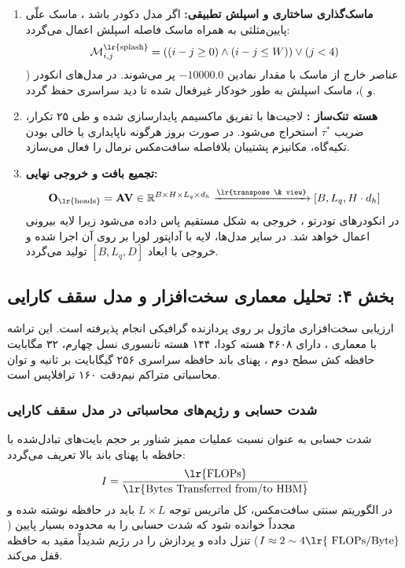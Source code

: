\begin{enumerate}
    \item \textbf{ماسک‌گذاری ساختاری و اسپلش تطبیقی:}
    اگر مدل دکودر باشد ، ماسک علّی پایین‌مثلثی به همراه ماسک فاصله اسپلش اعمال می‌گردد:
    \begin{equation}
    \mathcal{M}_{i, j}^{\text{\lr{splash}}} = \left( (i - j \ge 0) \land (i - j \le W) \right) \lor (j < 4)
    \end{equation}
    عناصر خارج از ماسک با مقدار نمادین $-10000.0$ پر می‌شوند. در مدل‌های انکودر ( و )، ماسک اسپلش به طور خودکار غیرفعال شده تا دید سراسری حفظ گردد.
    \item \textbf{هسته تنک‌ساز :} لاجیت‌ها با تفریق ماکسیمم پایدارسازی شده و طی ۲۵ تکرار، ضریب $\tau^*$ استخراج می‌شود. در صورت بروز هرگونه ناپایداری یا خالی بودن تکیه‌گاه، مکانیزم پشتیبان  بلافاصله سافت‌مکس نرمال را فعال می‌سازد.
    \item \textbf{تجمیع بافت و خروجی نهایی:}
    \begin{equation}
    \mathbf{O}_{\text{\lr{heads}}} = \mathbf{A} \mathbf{V} \in \mathbb{R}^{B \times H \times L_q \times d_h} \xrightarrow{\text{\lr{transpose \& view}}} [B, L_q, H \cdot d_h]
    \end{equation}
    در انکودرهای تودرتو ، خروجی به شکل مستقیم پاس داده می‌شود زیرا لایه بیرونی  اعمال خواهد شد. در سایر مدل‌ها، لایه  با آداپتور لورا بر روی آن اجرا شده و خروجی با ابعاد $[B, L_q, D]$ تولید می‌گردد.
\end{enumerate}

\subsection*{بخش ۴: تحلیل معماری سخت‌افزار و مدل سقف کارایی }
ارزیابی سخت‌افزاری ماژول بر روی پردازنده گرافیکی  انجام پذیرفته است. این تراشه با معماری ، دارای ۴۶۰۸ هسته کودا، ۱۴۴ هسته تانسوری نسل چهارم، ۳۲ مگابایت حافظه کش سطح دوم ، پهنای باند حافظه سراسری ۲۵۶ گیگابایت بر ثانیه و توان محاسباتی متراکم نیم‌دقت ۱۶۰ ترافلاپس است.

\subsubsection*{شدت حسابی و رژیم‌های محاسباتی در مدل سقف کارایی }
شدت حسابی  به عنوان نسبت عملیات ممیز شناور بر حجم بایت‌های تبادل‌شده با حافظه با پهنای باند بالا  تعریف می‌گردد:
\begin{equation}
I = \frac{\text{\lr{FLOPs}}}{\text{\lr{Bytes Transferred from/to HBM}}}
\end{equation}
در الگوریتم سنتی سافت‌مکس، کل ماتریس توجه $L \times L$ باید در حافظه  نوشته شده و مجدداً خوانده شود که شدت حسابی را به محدوده بسیار پایین ($I \approx 2 \sim 4 \text{\lr{ FLOPs/Byte}}$) تنزل داده و پردازش را در رژیم شدیداً مقید به حافظه  قفل می‌کند.

